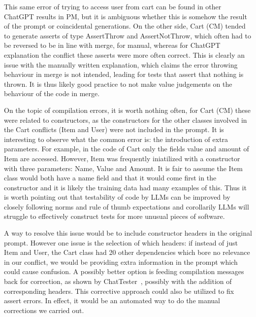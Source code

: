 This same error of trying to access user from cart can be found in other ChatGPT results in PM, but it is ambiguous
whether this is somehow the result of the prompt or coincidental generations. On the other side, Cart (CM) tended to generate
asserts of type AssertThrow and AssertNotThrow, which often had to be reversed to be in line with merge, for manual, whereas for
ChatGPT explanation the conflict these asserts were more often correct. This is clearly an issue with the manually written explanation,
which claims the error throwing behaviour in merge is not intended, leading for tests that assert that nothing is thrown.
It is thus likely good practice to not make value judgements on the behaviour of the code in merge.

On the topic of compilation errors, it is worth nothing often, for Cart (CM) these were related to constructors, as the constructors
for the other classes involved in the Cart conflicts (Item and User) were not included in the prompt. It is interesting
to observe what the common error is: the introduction of extra parameters. For example, in the code of Cart only the fields
value and amount of Item are accessed. However, Item was frequently iniatilized with a constructor with three parameters: Name,
Value and Amount. It is fair to assume the Item class would both have a name field and that it would come first in the constructor
and it is likely the training data had many examples of this. Thus it is worth pointing out that testability of code by LLMs can be
improved by closely following norms and rule of thumb expectations and corollarily LLMs will struggle to effectively construct tests
for more unusual pieces of software.

A way to resolve this issue would be to include constructor headers in the original prompt. However one issue is the selection of which
headers: if instead of just Item and User, the Cart class had 20 other dependencies which bore no relevance in our conflict, we would be
providing extra information in the prompt which could cause confusion. A possibly better option is feeding compilation messages back for correction,
as shown by ChatTester~\cite{kn:chattester}, possibly with the addition of corresponding headers. This corrective approach could also be utilized
to fix assert errors. In effect, it would be an automated way to do the manual corrections we carried out.


